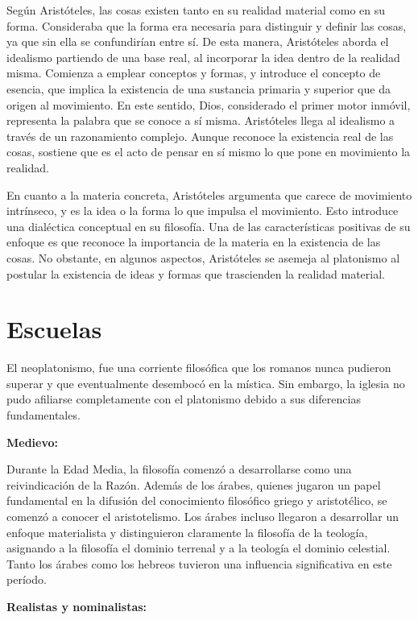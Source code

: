 \documentclass[
  a4paper,
]{article}
\begin{document}
Según Aristóteles, las cosas existen tanto en su realidad material como
en su forma. Consideraba que la forma era necesaria para distinguir y
definir las cosas, ya que sin ella se confundirían entre sí. De esta
manera, Aristóteles aborda el idealismo partiendo de una base real, al
incorporar la idea dentro de la realidad misma. Comienza a emplear
conceptos y formas, y introduce el concepto de esencia, que implica la
existencia de una sustancia primaria y superior que da origen al
movimiento. En este sentido, Dios, considerado el primer motor inmóvil,
representa la palabra que se conoce a sí misma. Aristóteles llega al
idealismo a través de un razonamiento complejo. Aunque reconoce la
existencia real de las cosas, sostiene que es el acto de pensar en sí
mismo lo que pone en movimiento la realidad.

En cuanto a la materia concreta, Aristóteles argumenta que carece de
movimiento intrínseco, y es la idea o la forma lo que impulsa el
movimiento. Esto introduce una dialéctica conceptual en su filosofía.
Una de las características positivas de su enfoque es que reconoce la
importancia de la materia en la existencia de las cosas. No obstante, en
algunos aspectos, Aristóteles se asemeja al platonismo al postular la
existencia de ideas y formas que trascienden la realidad material.

\hypertarget{escuelas}{%
\section{Escuelas}\label{escuelas}}

El neoplatonismo, fue una corriente filosófica que los romanos nunca
pudieron superar y que eventualmente desembocó en la mística. Sin
embargo, la iglesia no pudo afiliarse completamente con el platonismo
debido a sus diferencias fundamentales.

\textbf{Medievo:}

Durante la Edad Media, la filosofía comenzó a desarrollarse como una
reivindicación de la Razón. Además de los árabes, quienes jugaron un
papel fundamental en la difusión del conocimiento filosófico griego y
aristotélico, se comenzó a conocer el aristotelismo. Los árabes incluso
llegaron a desarrollar un enfoque materialista y distinguieron
claramente la filosofía de la teología, asignando a la filosofía el
dominio terrenal y a la teología el dominio celestial. Tanto los árabes
como los hebreos tuvieron una influencia significativa en este período.

\textbf{Realistas y nominalistas:}
\end{document}
